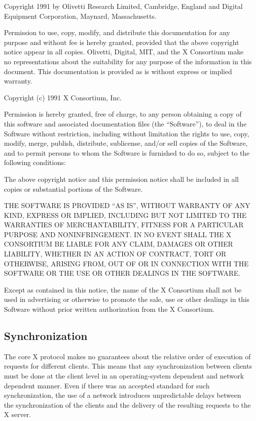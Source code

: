 Copyright 1991 by Olivetti Research Limited, Cambridge, England and
Digital Equipment Corporation, Maynard, Massachusetts.

{\small Permission to use, copy, modify, and distribute this documentation
for any purpose and without fee is hereby granted, provided that the above
copyright notice appear in all copies. Olivetti, Digital, MIT, and the
X Consortium
make no representations about the suitability for any purpose of the
information in this document. This documentation is provided as is without
express or implied warranty.}

Copyright (c) 1991 X Consortium, Inc.

{\small Permission is hereby granted, free of charge, to any person obtaining a copy
of this software and associated documentation files (the ``Software''), to deal
in the Software without restriction, including without limitation the rights
to use, copy, modify, merge, publish, distribute, sublicense, and/or sell
copies of the Software, and to permit persons to whom the Software is
furnished to do so, subject to the following conditions:

The above copyright notice and this permission notice shall be included in
all copies or substantial portions of the Software.

THE SOFTWARE IS PROVIDED ``AS IS'', WITHOUT WARRANTY OF ANY KIND, EXPRESS OR
IMPLIED, INCLUDING BUT NOT LIMITED TO THE WARRANTIES OF MERCHANTABILITY,
FITNESS FOR A PARTICULAR PURPOSE AND NONINFRINGEMENT.  IN NO EVENT SHALL THE
X CONSORTIUM BE LIABLE FOR ANY CLAIM, DAMAGES OR OTHER LIABILITY, WHETHER IN
AN ACTION OF CONTRACT, TORT OR OTHERWISE, ARISING FROM, OUT OF OR IN
CONNECTION WITH THE SOFTWARE OR THE USE OR OTHER DEALINGS IN THE SOFTWARE.

Except as contained in this notice, the name of the X Consortium shall not be
used in advertising or otherwise to promote the sale, use or other dealings
in this Software without prior written authorization from the X Consortium.}
\eject

\subsection*{Synchronization}

The core X protocol makes no guarantees about the relative order of execution
of requests for different clients. This means that any synchronization between
clients must be done at the client level in an operating-system dependent and
network dependent manner. Even if there was an accepted standard for such
synchronization, the use of a network introduces unpredictable delays between
the synchronization of the clients and the delivery of the resulting requests
to the X server.

